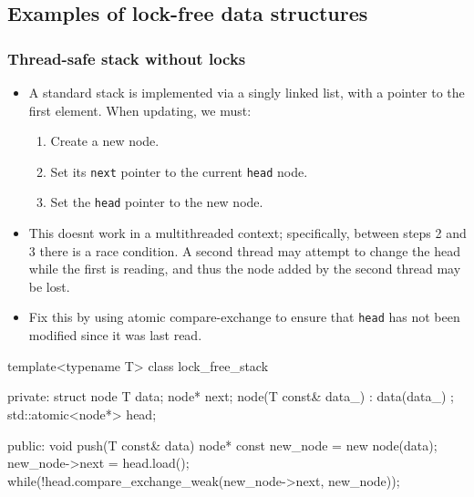 \documentclass[11pt, a4paper]{article}
\theoremstyle{definition}
\theoremstyle{remark}
\newcommand{\code}[1]{\lstinline|#1|}
\begin{document}
\subsection{Examples of lock-free data structures}
\subsubsection{Thread-safe stack without locks}
\begin{itemize}
    \item A standard stack is implemented via a singly linked list, with a pointer to the first element. When updating, we must:
    \begin{enumerate}
        \item Create a new node.
        \item Set its \code{next} pointer to the current \code{head} node.
        \item Set the \code{head} pointer to the new node.
    \end{enumerate}
    \item This doesnt work in a multithreaded context; specifically, between steps 2 and 3 there is a race condition. A second thread may attempt to change the head while the first is reading, and thus the node added by the second thread may be lost.
    \item Fix this by using atomic compare-exchange to ensure that \code{head} has not been modified since it was last read. 
\end{itemize}
\begin{cppcode}
template<typename T>
class lock_free_stack {
private:
    struct node {
        T data;
        node* next;
        node(T const& data_) : data(data_) {}
    };
    std::atomic<node*> head;

public:
    void push(T const& data) {
        node* const new_node = new node(data);
        new_node->next = head.load();
        while(!head.compare_exchange_weak(new_node->next, new_node));
    }
}
\end{cppcode}
\end{document}
